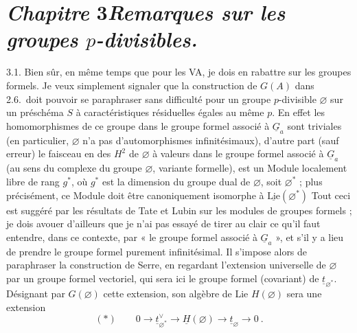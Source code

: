 \documentclass[11pt,a4paper]{article}
\begin{document}
\section*{\emph{Chapitre} 3\quad \emph{Remarques sur les groupes $p$-divisibles.}}

3.1. Bien sûr, en même temps que pour les VA, je dois en rabattre sur les
groupes formels. Je veux simplement signaler que la construction de $G(A)$ dans
2.6.\ doit pouvoir se paraphraser sans difficulté pour un groupe $p$-divisible
$\varnothing$ sur un préschéma $S$ à caractéristiques résiduelles égales au
même $p$. En effet les homomorphismes de ce groupe dans le groupe formel
associé à $\underline{G}_a$ sont triviales (en particulier, $\varnothing$ n'a
pas d'automorphismes infinitésimaux), d'autre part (sauf erreur) le faisceau en
  des $H^2$ de $\varnothing$ à valeurs dans le
groupe formel associé à $\underline{G}_a$ (au sens du complexe du groupe
$\varnothing$, variante formelle), est un Module localement libre de rang
$g^*$, où $g^*$ est la dimension du groupe dual de $\varnothing$, soit
$\varnothing^*$ ; plus précisément, ce Module doit être canoniquement
isomorphe à $\underline{\mathrm{Lie}}(\varnothing^*)$  \supplied{(}Tout ceci est suggéré par les
résultats de Tate et Lubin sur les modules de groupes formels ; je dois avouer
d'ailleurs que je n'ai pas essayé de tirer au clair ce qu'il faut entendre,
dans ce contexte, par « le groupe formel associé à $\underline{G}_a$ », et
s'il y a lieu de prendre le groupe formel purement infinitésimal.\add{)} Il
s'impose alors de paraphraser la construction de Serre, en regardant
l'extension \struck{\ill{}} universelle de $\varnothing$ par un groupe formel
vectoriel, qui sera ici le groupe formel (covariant) de
$\underline{t}_{\varnothing^*}$. Désignant par $G(\varnothing)$ cette
extension, son algèbre de Lie $H(\varnothing)$ sera une extension
\[
  (*)\qquad 0\to\underline{t}^{\vee}_{\varnothing^*}\to\underline{H}(\varnothing)
  \to\underline{t}_{\varnothing}\to 0\ .
\]
\end{document}
